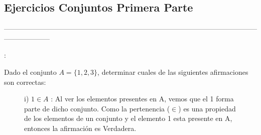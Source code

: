 \documentclass[10pt]{article}
\begin{document}
\subsection{Ejercicios Conjuntos Primera Parte}
--------------------------------------------------------------------------------------------------------------------------------
\begin{ej}:

Dado el conjunto $A=\{1,2,3\}$, determinar cuales de las siguientes afirmaciones son correctas:
\begin{itemize}
\begin{figure}[H]
\begin{minipage}[b]{0.4\linewidth}
		\centering
 \item[i)] $1 \in A$ : \sffamily Al ver los elementos presentes en A, vemos que el 1 forma parte de dicho conjunto. Como la pertenencia ($\in$) es una propiedad de los elementos de un conjunto y el elemento 1 esta presente en A, entonces la afirmación es \textcolor{G}{Verdadera}.    
\end{minipage}
\begin{minipage}[b]{0.5\linewidth}
		\centering
{}
\end{minipage}
\end{figure}


\end{itemize}
\end{ej}
\end{document}
